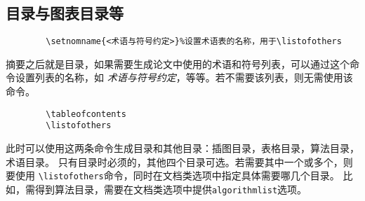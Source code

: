 \documentclass[figurelist,tablelist,algorithmlist,nomlist,masters]{seuthesix}
\begin{document}
	\subsection{目录与图表目录等}
	{\color{magenta}
		\begin{verbatim}
		\setnomname{<术语与符号约定>}%设置术语表的名称，用于\listofothers
		\end{verbatim}
	}
	摘要之后就是目录，如果需要生成论文中使用的术语和符号列表，可以通过这个命令设置列表的名称，如
	\textit{术语与符号约定}，等等。若不需要该列表，则无需使用该命令。
	
	{\color{magenta}
		\begin{verbatim}
		\tableofcontents
		\listofothers
		\end{verbatim}
	}
	此时可以使用这两条命令生成目录和其他目录：插图目录，表格目录，算法目录，术语目录。
	只有目录时必须的，其他四个目录可选。若需要其中一个或多个，则要使用
	\verb+\listofothers+命令，同时在文档类选项中指定具体需要哪几个目录。
	比如，需得到算法目录，需要在文档类选项中提供\texttt{algorithmlist}选项。
	
\end{document}
